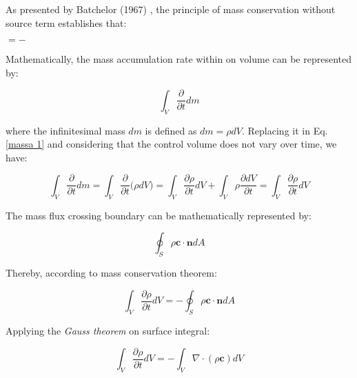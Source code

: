 As presented by Batchelor (1967) \cite{batchelor1967},
 the principle of mass conservation without source term
 establishes that:


\medskip
\begin{center}
           $= -$ 
\end{center}

\noindent Mathematically, the mass accumulation rate within on volume
 can be represented by:

\begin{equation} \label{massa 1} 
 \int_{V} \frac{\partial}{\partial t} dm
\end{equation}


\noindent where the infinitesimal mass $dm$ is defined
 as $dm = \rho dV$. Replacing it in Eq. \ref{massa 1}
 and considering that the control volume does not vary over time,
 we have:

\begin{equation}
 \int_{V} \frac{\partial}{\partial t} dm
 =
 \int_{V} \frac{\partial}{\partial t} \big( \rho dV \big)
 = 
 \int_{V} \frac{\partial \rho}{\partial t} dV
 +
 \int_{V} \rho \frac{\partial dV}{\partial t}
 = 
 \int_{V} \frac{\partial \rho}{\partial t} dV
\end{equation}

\medskip
\noindent The mass flux crossing boundary can be mathematically represented by:


\begin{equation}  
 \oint_{S} \rho \textbf{c} \cdot \textbf{n} dA
\end{equation}

\medskip
\noindent Thereby, according to mass conservation theorem:

\begin{equation}
 \int_{V} \frac{\partial \rho}{\partial t} dV
 = - 
 \oint_{S} \rho \textbf{c} \cdot \textbf{n} dA
\end{equation}

\medskip
\noindent Applying the \textit{Gauss theorem} on surface integral:

\begin{equation}
 \int_{V} \frac{\partial \rho}{\partial t} dV
 = - 
 \int_{V} \nabla \cdot \left( \rho \textbf{c} \right) dV
\end{equation}

